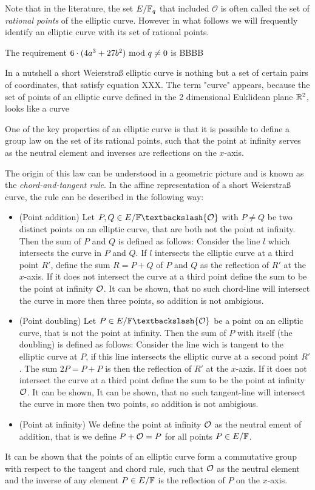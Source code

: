 Note that in the literature, the set $E/\mathbb{F}_q$ that included $\mathcal{O}$ is often called the set of \textit{rational points} of the elliptic curve. However in what follows we will frequently identify an elliptic curve with its set of rational points.

The requirement $6\cdot(4a^3+ 27b^2) \text{ mod } q\neq 0$ is BBBB 

In a nutshell a short Weierstraß elliptic curve is nothing but a set of certain pairs of coordinates, that satisfy equation XXX. The term "curve" appears, because the set of points of an elliptic curve defined in the 2 dimensional Euklidean plane $\mathbb{R}^2$, looks like a curve  

One of the key properties of an elliptic curve is that it is possible to define a group law on the set of its rational points, such that the point at infinity serves as the neutral element and inverses are reflections on the $x$-axis.

The origin of this law can be understood in a geometric picture and is known as the \textit{chord-and-tangent rule}. In the affine representation of a short Weierstraß curve, the rule can be described in the following way:
\begin{itemize}
\item (Point addition) Let $P, Q\in E/\F\textbackslash \{\Oinf\}$ with $P\neq Q$ be two distinct points on an elliptic curve, that are both not the point at infinity. Then the sum of $P$ and $Q$ is defined as follows: Consider the line $l$ which intersects the curve in $P$ and $Q$. If $l$ intersects the elliptic curve at a third point $R'$, define the sum $R=P+Q$ of $P$ and $Q$ as the reflection of $R'$ at the $x$-axis. If it does not intersect the curve at a third point define the sum to be the point at infinity $\mathcal{O}$. It can be shown, that no such chord-line will intersect the curve in more then three points, so addition is not ambigious.
\item (Point doubling) Let $P \in E/\F\textbackslash \{\Oinf\}$ be a point on an elliptic curve, that is not the point at infinity. Then the sum of $P$ with itself (the doubling) is defined as follows: Consider the line wich is tangent to the elliptic curve at $P$, if this line intersects the elliptic curve at a second point $R'$. The sum $2P=P+P$ is then the reflection of $R'$ at the $x$-axis. If it does not intersect the curve at a third point define the sum to be the point at infinity $\mathcal{O}$. It can be shown, It can be shown, that no such tangent-line will intersect the curve in more then two points, so addition is not ambigious.
\item (Point at infinity) We define the point at infinity $\mathcal{O}$ as the neutral ement of addition, that is we define $P+\mathcal{O} = P$ for all points $P\in E/\mathbb{F}$.
\end{itemize}
It can be shown that the points of an elliptic curve form a commutative group with respect to the tangent and chord rule, such that $\mathcal{O}$ as the neutral element and the inverse of any element $P\in E/\mathbb{F}$ is the reflection of $P$ on the $x$-axis.


